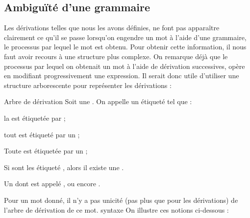     \subsection{Ambiguïté d'une grammaire}
    
    Les dérivations telles que nous les avons définies, ne font pas apparaître clairement ce qu'il se passe lorsqu'on engendre un mot à l'aide d'une grammaire, \ie le processus par lequel le mot est obtenu.
    Pour obtenir cette information, il nous faut avoir recours à une structure plus complexe. On remarque déjà que le processus par lequel on obtenait un mot à l'aide de dérivation successives, opère en modifiant progressivement une expression. Il serait donc utile d'utiliser une structure arborescente pour représenter les dérivations :
    
    \begin{definition}{Arbre de dérivation}{}
        Soit  une . On appelle  un  étiqueté tel que :
        \begin{enumerate}
            \itast la  est étiquetée par  ;
            
            \itast tout  est étiqueté par un  ;
            
            \itast Toute  est étiquetée par un  ;
            
            \itast Si  sont les  étiqueté , alors il existe une .
        \end{enumerate}
        Un  dont  est appelé ,  ou encore .
    \end{definition}
    Pour un mot donné, il n'y a pas unicité (pas plus que pour les dérivations) de l'arbre de dérivation de ce mot. syntaxe On illustre ces notions ci-dessous :
